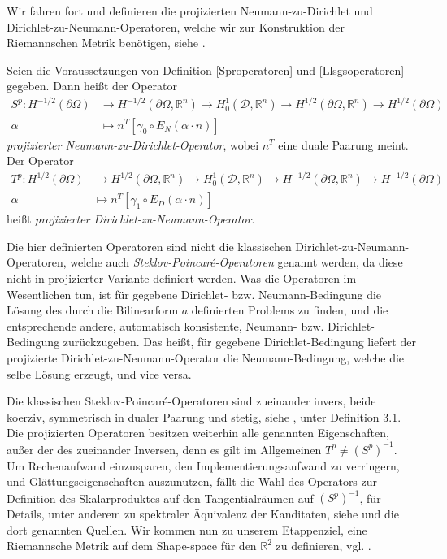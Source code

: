 Wir fahren fort und definieren die projizierten Neumann-zu-Dirichlet und Dirichlet-zu-Neumann-Operatoren, welche wir zur Konstruktion der Riemannschen Metrik benötigen, siehe \cite{bfgs2}.

\begin{defi}\label{Randoperatoren}
Seien die Voraussetzungen von Definition \ref{Sproperatoren} und \ref{Llsgsoperatoren} gegeben. Dann heißt der Operator
\begin{align*}
	S^p: H^{-1/2}(\partial\Omega) &\rightarrow H^{-1/2}(\partial\Omega, \mathbb{R}^n) \rightarrow H^1_0(\mathcal{D},\mathbb{R}^n) \rightarrow H^{1/2}(\partial\Omega, \mathbb{R}^n) \rightarrow H^{1/2}(\partial\Omega) \\
	\alpha &\mapsto n^T[\gamma_0 \circ E_N(\alpha \cdot n)]
\end{align*}
\textit{projizierter Neumann-zu-Dirichlet-Operator}, wobei $n^T$ eine duale Paarung meint.
Der Operator
\begin{align*}
	T^p: H^{1/2}(\partial\Omega) &\rightarrow H^{1/2}(\partial\Omega,\mathbb{R}^n) \rightarrow H^1_0(\mathcal{D},\mathbb{R}^n) \rightarrow H^{-1/2}(\partial\Omega,\mathbb{R}^n) \rightarrow H^{-1/2}(\partial\Omega) \\
	\alpha &\mapsto n^T[\gamma_1 \circ E_D(\alpha \cdot n)]
\end{align*}
heißt \textit{projizierter Dirichlet-zu-Neumann-Operator}.
\end{defi}

Die hier definierten Operatoren sind nicht die klassischen Dirichlet-zu-Neumann-Operatoren, welche auch \textit{Steklov-Poincaré-Operatoren} genannt werden, da diese nicht in projizierter Variante definiert werden. Was die Operatoren im Wesentlichen tun, ist für gegebene Dirichlet- bzw. Neumann-Bedingung die Lösung des durch die Bilinearform $a$ definierten Problems zu finden, und die entsprechende andere, automatisch konsistente, Neumann- bzw. Dirichlet-Bedingung zurückzugeben. Das heißt, für gegebene Dirichlet-Bedingung liefert der projizierte Dirichlet-zu-Neumann-Operator die Neumann-Bedingung, welche die selbe Lösung erzeugt, und vice versa.

Die klassischen Steklov-Poincaré-Operatoren sind zueinander invers, beide koerziv, symmetrisch in dualer Paarung und stetig, siehe \cite{bfgs2}, unter Definition 3.1. Die projizierten Operatoren besitzen weiterhin alle genannten Eigenschaften, außer der des zueinander Inversen, denn es gilt im Allgemeinen $T^p \neq (S^p)^{-1}$. Um Rechenaufwand einzusparen, den Implementierungsaufwand zu verringern, und Glättungseigenschaften auszunutzen, fällt die Wahl des Operators zur Definition des Skalarproduktes auf den Tangentialräumen auf $(S^p)^{-1}$, für Details, unter anderem zu spektraler Äquivalenz der Kanditaten, siehe \cite{bfgs2} und die dort genannten Quellen. Wir kommen nun zu unserem Etappenziel, eine Riemannsche Metrik auf dem Shape-space für den $\mathbb{R}^2$ zu definieren, vgl. \cite{bfgs2}.

